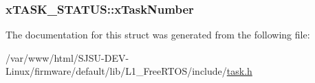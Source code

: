 \subsubsection[{\texorpdfstring{x\+Task\+Number}{xTaskNumber}}]{ x\+T\+A\+S\+K\+\_\+\+S\+T\+A\+T\+U\+S\+::x\+Task\+Number}\hypertarget{structxTASK__STATUS_acd44468ba37270b04f83d0833c098057}{}\label{structxTASK__STATUS_acd44468ba37270b04f83d0833c098057}


The documentation for this struct was generated from the following file\+:\begin{DoxyCompactItemize}
\item 
/var/www/html/\+S\+J\+S\+U-\/\+D\+E\+V-\/\+Linux/firmware/default/lib/\+L1\+\_\+\+Free\+R\+T\+O\+S/include/\hyperlink{task_8h}{task.\+h}\end{DoxyCompactItemize}
